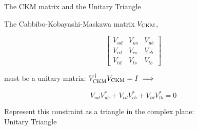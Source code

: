 \documentclass{beamer}
\begin{document}
\begin{frame}{The CKM matrix and the Unitary Triangle}
  \begin{center}
    The Cabbibo-Kobayashi-Maskawa matrix $V_{\rm CKM}$,
  \end{center}
  \begin{equation*}
    \begin{bmatrix}
      V_{ud} & V_{us} & V_{ub} \\
      V_{cd} & V_{cs} & V_{cb} \\
      V_{td} & V_{ts} & V_{tb}
    \end{bmatrix}
  \end{equation*}
  \begin{center}
    must be a unitary matrix: $V^\dagger_{\rm CKM}V_{\rm CKM} = I\implies$
  \end{center}
  \vspace{0.5cm}
  \begin{equation*}
    V^{\phantom{*}}_{ud}V^*_{ub} + V^{\phantom{*}}_{cd}V^*_{cb} + V^{\phantom{*}}_{td}V^*_{tb} = 0
  \end{equation*}
  \begin{center}
    Represent this constraint as a triangle in the complex plane:\\Unitary Triangle
  \end{center}
\end{frame}
\end{document}

